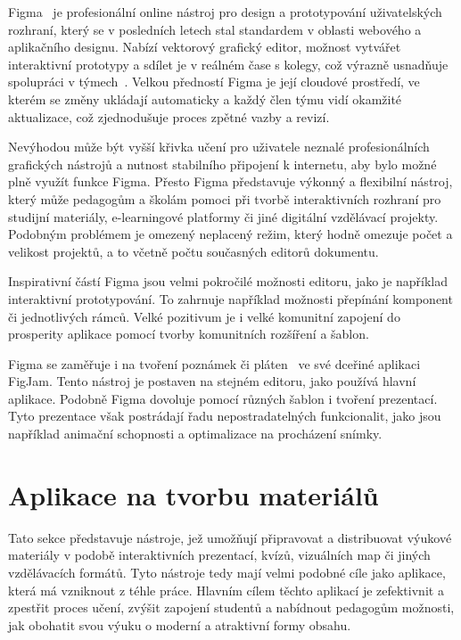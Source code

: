 Figma~\cite{figma_website} je profesionální online nástroj pro design a prototypování uživatelských rozhraní, který se v posledních letech stal standardem v oblasti webového a aplikačního designu. 
Nabízí vektorový grafický editor, možnost vytvářet interaktivní prototypy a sdílet je v reálném čase s kolegy, což výrazně usnadňuje spolupráci v týmech~\cite{figma_website}. 
Velkou předností Figma je její cloudové prostředí, ve kterém se změny ukládají automaticky a každý člen týmu vidí okamžité aktualizace, což zjednodušuje proces zpětné vazby a revizí. 

Nevýhodou může být vyšší křivka učení pro uživatele neznalé profesionálních grafických nástrojů a nutnost stabilního připojení k internetu, aby bylo možné plně využít funkce Figma. 
Přesto Figma představuje výkonný a flexibilní nástroj, který může pedagogům a školám pomoci při tvorbě interaktivních rozhraní pro studijní materiály, e-learningové platformy či jiné digitální vzdělávací projekty.
Podobným problémem je omezený neplacený režim, který hodně omezuje počet a velikost projektů, a to včetně počtu současných editorů dokumentu.

Inspirativní částí Figma jsou velmi pokročilé možnosti editoru, jako je například interaktivní prototypování.
To zahrnuje například možnosti přepínání komponent či jednotlivých rámců.
Velké pozitivum je i velké komunitní zapojení do prosperity aplikace pomocí tvorby komunitních rozšíření a šablon.

Figma se zaměřuje i na tvoření poznámek či pláten~\cite{figma_figjam} ve své dceřiné aplikaci FigJam.
Tento nástroj je postaven na stejném editoru, jako používá hlavní aplikace.
Podobně Figma dovoluje pomocí různých šablon i tvoření prezentací.
Tyto prezentace však postrádají řadu nepostradatelných funkcionalit, jako jsou například animační schopnosti a optimalizace na procházení snímky.

\section{Aplikace na tvorbu materiálů}\label{text:analyza/materialy}

Tato sekce představuje nástroje, jež umožňují připravovat a distribuovat výukové materiály v podobě interaktivních prezentací, kvízů, vizuálních map či jiných vzdělávacích formátů.
Tyto nástroje tedy mají velmi podobné cíle jako aplikace, která má vzniknout z téhle práce.
Hlavním cílem těchto aplikací je zefektivnit a zpestřit proces učení, zvýšit zapojení studentů a nabídnout pedagogům možnosti, jak obohatit svou výuku o moderní a atraktivní formy obsahu.

